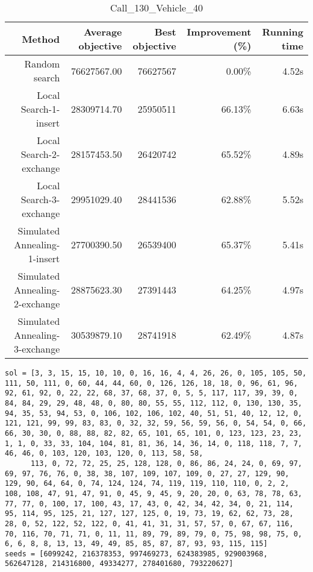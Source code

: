 \begin{table}[ht]
\centering
\caption{Call\_130\_Vehicle\_40}
\label{tab:call130vehicle40}
\begin{tabular}{|r|r|r|r|r|}
Method & Average objective & Best objective & Improvement (\%) & Running time \\
\hline
Random search & 76627567.00 & 76627567 & 0.00\% & 4.52s\\
Local Search-1-insert & 28309714.70 & 25950511 & 66.13\% & 6.63s\\
Local Search-2-exchange & 28157453.50 & 26420742 & 65.52\% & 4.89s\\
Local Search-3-exchange & 29951029.40 & 28441536 & 62.88\% & 5.52s\\
Simulated Annealing-1-insert & 27700390.50 & 26539400 & 65.37\% & 5.41s\\
Simulated Annealing-2-exchange & 28875623.30 & 27391443 & 64.25\% & 4.97s\\
Simulated Annealing-3-exchange & 30539879.10 & 28741918 & 62.49\% & 4.87s\\
\end{tabular}%
\end{table}
\begin{lstlisting}[label={lst:call130vehicle40},caption=Optimal solution call\_130\_vehicle\_40]
sol = [3, 3, 15, 15, 10, 10, 0, 16, 16, 4, 4, 26, 26, 0, 105, 105, 50, 111, 50, 111, 0, 60, 44, 44, 60, 0, 126, 126, 18, 18, 0, 96, 61, 96, 92, 61, 92, 0, 22, 22, 68, 37, 68, 37, 0, 5, 5, 117, 117, 39, 39, 0, 84, 84, 29, 29, 48, 48, 0, 80, 80, 55, 55, 112, 112, 0, 130, 130, 35, 94, 35, 53, 94, 53, 0, 106, 102, 106, 102, 40, 51, 51, 40, 12, 12, 0, 121, 121, 99, 99, 83, 83, 0, 32, 32, 59, 56, 59, 56, 0, 54, 54, 0, 66, 66, 30, 30, 0, 88, 88, 82, 82, 65, 101, 65, 101, 0, 123, 123, 23, 23, 1, 1, 0, 33, 33, 104, 104, 81, 81, 36, 14, 36, 14, 0, 118, 118, 7, 7, 46, 46, 0, 103, 120, 103, 120, 0, 113, 58, 58,
      113, 0, 72, 72, 25, 25, 128, 128, 0, 86, 86, 24, 24, 0, 69, 97, 69, 97, 76, 76, 0, 38, 38, 107, 109, 107, 109, 0, 27, 27, 129, 90, 129, 90, 64, 64, 0, 74, 124, 124, 74, 119, 119, 110, 110, 0, 2, 2, 108, 108, 47, 91, 47, 91, 0, 45, 9, 45, 9, 20, 20, 0, 63, 78, 78, 63, 77, 77, 0, 100, 17, 100, 43, 17, 43, 0, 42, 34, 42, 34, 0, 21, 114, 95, 114, 95, 125, 21, 127, 127, 125, 0, 19, 73, 19, 62, 62, 73, 28, 28, 0, 52, 122, 52, 122, 0, 41, 41, 31, 31, 57, 57, 0, 67, 67, 116, 70, 116, 70, 71, 71, 0, 11, 11, 89, 79, 89, 79, 0, 75, 98, 98, 75, 0, 6, 6, 8, 8, 13, 13, 49, 49, 85, 85, 87, 87, 93, 93, 115, 115]
seeds = [6099242, 216378353, 997469273, 624383985, 929003968, 562647128, 214316800, 49334277, 278401680, 793220627]
\end{lstlisting}%
\clearpage


